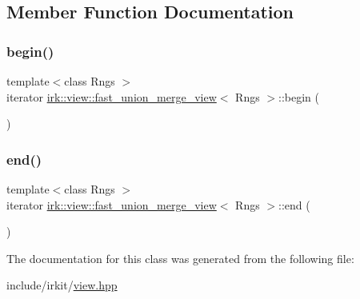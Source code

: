 \subsection{Member Function Documentation}
\mbox{\label{classirk_1_1view_1_1fast__union__merge__view_a82c8219a38fc24706d3744af07a974f7}} 
\subsubsection{\texorpdfstring{begin()}{begin()}}
{\footnotesize\ttfamily template$<$class Rngs $>$ \\
iterator \mbox{\hyperlink{classirk_1_1view_1_1fast__union__merge__view}{irk\+::view\+::fast\+\_\+union\+\_\+merge\+\_\+view}}$<$ Rngs $>$\+::begin (\begin{DoxyParamCaption}{ }\end{DoxyParamCaption})\hspace{0.3cm}{\ttfamily [inline]}}

\mbox{\label{classirk_1_1view_1_1fast__union__merge__view_a4d2d07efe1f3c65330bb31545816aa0f}} 
\subsubsection{\texorpdfstring{end()}{end()}}
{\footnotesize\ttfamily template$<$class Rngs $>$ \\
iterator \mbox{\hyperlink{classirk_1_1view_1_1fast__union__merge__view}{irk\+::view\+::fast\+\_\+union\+\_\+merge\+\_\+view}}$<$ Rngs $>$\+::end (\begin{DoxyParamCaption}{ }\end{DoxyParamCaption})\hspace{0.3cm}{\ttfamily [inline]}}



The documentation for this class was generated from the following file\+:\begin{DoxyCompactItemize}
\item 
include/irkit/\mbox{\hyperlink{view_8hpp}{view.\+hpp}}\end{DoxyCompactItemize}
